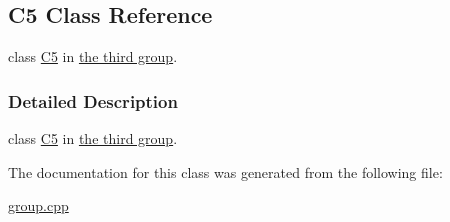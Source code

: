 \hypertarget{class_c5}{}\subsection{C5 Class Reference}
\label{class_c5}


class \hyperlink{class_c5}{C5} in \hyperlink{group__group3}{the third group}.  




\subsubsection{Detailed Description}
class \hyperlink{class_c5}{C5} in \hyperlink{group__group3}{the third group}. 

The documentation for this class was generated from the following file\+:\begin{DoxyCompactItemize}
\item 
\hyperlink{group_8cpp}{group.\+cpp}\end{DoxyCompactItemize}
